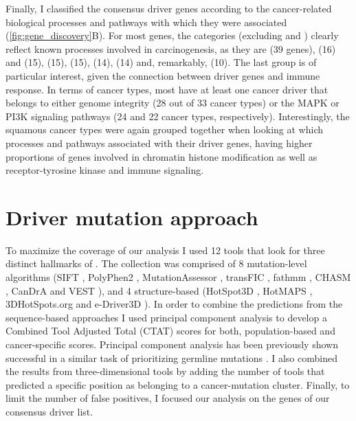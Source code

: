 Finally, I classified the consensus driver genes according to the cancer-related biological processes and pathways with which they were associated (\autoref{fig:gene_discovery}B). For most genes, the categories (excluding  and ) clearly reflect known processes involved in carcinogenesis, as they are  (39 genes),  (16) and  (15),  (15),  (15),  (14),  (14) and, remarkably,  (10). The last group is of particular interest, given the connection between driver genes and immune response. In terms of cancer types, most have at least one cancer driver that belongs to either genome integrity (28 out of 33 cancer types) or the MAPK or PI3K signaling pathways (24 and 22 cancer types, respectively). Interestingly, the squamous cancer types were again grouped together when looking at which processes and pathways associated with their driver genes, having higher proportions of genes involved in chromatin histone modification as well as receptor-tyrosine kinase and immune signaling. 

\section{Driver mutation approach}

To maximize the coverage of our analysis I used 12 tools that look for three distinct hallmarks of .  The collection was comprised of 8 mutation-level algorithms (SIFT \cite{RN9}, PolyPhen2 \cite{RN10}, MutationAssessor \cite{RN38}, transFIC \cite{RN53}, fathmm \cite{RN39}, CHASM \cite{RN29}, CanDrA \cite{RN36} and VEST \cite{RN30}), and 4 structure-based (HotSpot3D \cite{RN132}, HotMAPS \cite{RN60}, 3DHotSpots.org \cite{RN133} and e-Driver3D \cite{RN45}). In order to combine the predictions from the sequence-based approaches I used principal component analysis to develop a Combined Tool Adjusted Total (CTAT) scores for both, population-based and cancer-specific scores. Principal component analysis has been previously shown successful in a similar task of prioritizing germline mutations \cite{RN179}. I also combined the results from three-dimensional tools by adding the number of tools that predicted a specific position as belonging to a cancer-mutation cluster. Finally, to limit the number of false positives, I focused our analysis on the genes of our consensus driver list.

